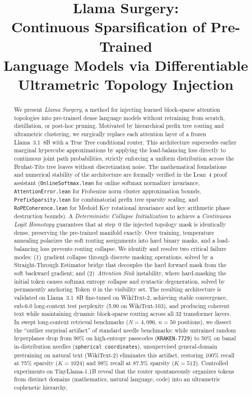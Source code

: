 \documentclass[11pt,a4paper]{article}
\title{\textbf{Llama Surgery:}\\
Continuous Sparsification of Pre-Trained\\
Language Models via Differentiable\\
Ultrametric Topology Injection}
\author{
}
\date{}
\begin{document}
\maketitle

\begin{abstract}
We present \emph{Llama Surgery}, a method for injecting learned block-sparse attention topologies into pre-trained dense language models without retraining from scratch, distillation, or post-hoc pruning. Motivated by hierarchical prefix tree routing and ultrametric clustering, we surgically replace each attention layer of a frozen Llama~3.1~8B with a True Tree conditional router. This architecture supersedes earlier marginal hypercube approximations by applying the load-balancing loss directly to continuous joint path probabilities, strictly enforcing a uniform distribution across the Bruhat-Tits tree leaves without discretization noise. The mathematical foundations and numerical stability of the architecture are formally verified in the Lean~4 proof assistant (\texttt{OnlineSoftmax.lean} for online softmax normalizer invariance, \texttt{AttentionError.lean} for Frobenius norm cluster approximation bounds, \texttt{PrefixSparsity.lean} for combinatorial prefix tree sparsity scaling, and \texttt{RoPECoherence.lean} for Medoid Key rotational invariance and key arithmetic phase destruction bounds). A \emph{Deterministic Collapse Initialization} to achieve a \emph{Continuous Logit Homotopy} guarantees that at step~0 the injected topology mask is identically dense, preserving the pre-trained manifold exactly. Over training, temperature annealing polarizes the soft routing assignments into hard binary masks, and a load-balancing loss prevents routing collapse. We identify and resolve two critical failure modes: (1)~gradient collapse through discrete masking operations, solved by a Straight-Through Estimator bridge that decouples the hard forward mask from the soft backward gradient; and (2)~\emph{Attention Sink} instability, where hard-masking the initial token causes softmax entropy collapse and syntactic degeneration, solved by permanently anchoring Token~0 in the visibility set. The resulting architecture is validated on Llama~3.1~8B fine-tuned on WikiText-2, achieving stable convergence, sub-6.0 long-context test perplexity (5.90 on WikiText-103), and producing coherent text while maintaining dynamic block-sparse routing across all 32 transformer layers. In swept long-context retrieval benchmarks ($N=4{,}096$, $n=50$ positions), we dissect the ``outlier surprisal artifact'' of standard needle benchmarks: while untrained random hyperplanes drop from 90\% on high-entropy passcodes (\texttt{KRAKEN-7729}) to 50\% on banal in-distribution needles (\texttt{spherical coordinates}), unsupervised general-domain pretraining on natural text (WikiText-2) eliminates this artifact, restoring 100\% recall at 75\% sparsity ($K=1024$) and 98\% recall at 87.5\% sparsity ($K=512$). Controlled experiments on TinyLlama-1.1B reveal that the router spontaneously organizes tokens from distinct domains (mathematics, natural language, code) into an ultrametric cophenetic hierarchy, 
\end{abstract}
\end{document}
